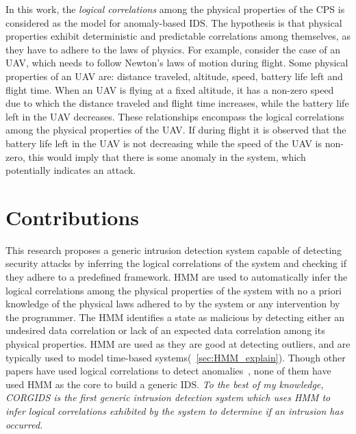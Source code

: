 In this work, the {\em logical correlations} among the physical properties of the \ac{CPS} is considered as the model for anomaly-based \ac{IDS}. The hypothesis is that physical properties exhibit deterministic and predictable correlations among themselves, as they have to adhere to the laws of physics. For example, consider the case of an \ac{UAV}, which needs to follow Newton's laws of motion during flight. Some physical properties of an \ac{UAV} are: distance traveled, altitude, speed, battery life left and flight time. When an \ac{UAV} is flying at a fixed altitude, it has a non-zero speed due to which the distance traveled and flight time increases, while the battery life left in the \ac{UAV} decreases. These relationships encompass the logical correlations among the physical properties of the \ac{UAV}. If during flight it is observed that the battery life left in the \ac{UAV} is not decreasing while the speed of the \ac{UAV} is non-zero, this would imply that there is some anomaly in the system, which potentially indicates an attack.

\section{Contributions}
\label{sec:Contributions}

This research proposes a generic intrusion detection system capable of detecting security attacks by inferring the logical correlations of the system and checking if they adhere to a predefined framework. \ac{HMM}  are used to automatically infer the logical correlations among the physical properties of the system with no a priori knowledge of the physical laws adhered to by the system or any intervention by the programmer. The \ac{HMM} identifies a state as malicious by detecting either an undesired data correlation or lack of an expected data correlation among its physical properties. \ac{HMM} are used as they are good at detecting outliers, and are typically used to model time-based systems(~\autoref{sec:HMM_explain}).  
Though other papers have used logical correlations to detect anomalies~\cite{iturbe2017feasibility,krotofil2015process,chen2018learning,zohrevand2016hidden}, none of them have used \ac{HMM} as the core to build a generic \ac{IDS}. \textit{To the best of my knowledge, \ac{CORGIDS} is the first generic intrusion detection system which uses \ac{HMM} to infer logical correlations exhibited by the system to determine if an intrusion has occurred.}


